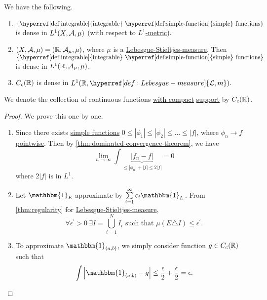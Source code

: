 \begin{theorem}
	We have the following.
	\begin{enumerate}
		\item \(\{\text{\hyperref[def:integrable]{integrable} \hyperref[def:simple-function]{simple} functions} \}\) is dense
		      in \(L^1(X, \mathcal{\MakeUppercase{a}} , \mu )\) (with respect to \hyperref[def:L-1-metric]{\(L^1\)-metric}).
		\item \((X, \mathcal{\MakeUppercase{a}} , \mu ) = (\mathbb{\MakeUppercase{r}} , \mathcal{\MakeUppercase{a}} _\mu , \mu )\),
		      where \(\mu\) is a \hyperref[def:Lebesgue-Stieltjes-measure]{Lebesgue-Stieltjes-measure}. Then
		      \(\{\text{\hyperref[def:integrable]{integrable} \hyperref[def:simple-function]{simple} functions} \}\)
		      is dense in \(L^1(\mathbb{\MakeUppercase{r}} , \mathcal{\MakeUppercase{a}} _\mu , \mu )\).
		\item \(C_c(\mathbb{\MakeUppercase{r}} )\) is dense in \(L^1(\mathbb{\MakeUppercase{r}} , \hyperref[def:Lebesgue-measure]{\mathcal{\MakeUppercase{l}} , m})\).
	\end{enumerate}
\end{theorem}
\begin{notation}
	We denote the collection of continuous functions \underline{with compact} \hyperref[def:support]{support}
	by \(C_c(\mathbb{\MakeUppercase{r}} )\).
\end{notation}
\begin{proof}
	We prove this one by one.
	\begin{enumerate}
		\item Since there exists \hyperref[def:simple-function]{simple functions} \(0\leq \left\vert \phi _1 \right\vert \leq \left\vert \phi _2 \right\vert\leq \ldots \leq \left\vert f \right\vert  \),
		      where \(\phi _{n}\to f\) \hyperref[def:pointwise-convergence]{pointwise}. Then by \autoref{thm:dominated-convergence-theorem}, we have
		      \[
			      \lim\limits_{n \to \infty} \int \underbrace{\left\vert f_{n} - f\right\vert }_{\leq \left\vert \phi _{n} \right\vert + \left\vert f  \right\vert\leq 2\left\vert f \right\vert } = 0
		      \]
		      where \(2\left\vert f \right\vert \) is in \(L^1\).
		\item Let \(\mathbbm{1}_{E} \) \underline{approximate} by \(\sum\limits_{i=1}^{\infty} c_{i}\mathbbm{1}_{I_{i}} \). From \autoref{thm:regularity} for
		      \hyperref[def:Lebesgue-Stieltjes-measure]{Lebesgue-Stieltjes-measure},
		      \[
			      \forall \epsilon ^\prime >0\ \exists I = \bigcup\limits_{i=1}^{N} I_{i}\text{ such that } \mu (E\triangle I)\leq \epsilon ^\prime .
		      \]
		\item To approximate \(\mathbbm{1}_{(a, b)} \), we simply consider function \(g\in C_c(\mathbb{\MakeUppercase{r}} )\) such that
		      \[
			      \int \left\vert \mathbbm{1}_{(a, b)} - g \right\vert \leq \frac{\epsilon}{2} + \frac{\epsilon}{2} = \epsilon .
		      \]
	\end{enumerate}
\end{proof}